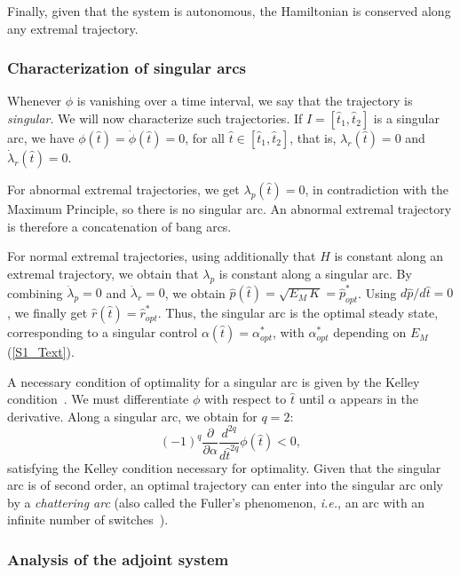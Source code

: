 Finally, given that the system is autonomous, the Hamiltonian is conserved along any extremal trajectory.

\subsubsection{Characterization of singular arcs}

Whenever $\phi$ is vanishing over a time interval, we say that the trajectory is \textit{singular}.
We will now characterize such trajectories.
If $I=[\hat{t}_1,\hat{t}_2]$ is a singular arc, we have $\phi(\hat{t})=\dot{\phi}(\hat{t})=0$, for all $\hat{t}\in[\hat{t}_1,\hat{t}_2]$, that is, $\lambda_r(\hat{t})=0$ and $\dot\lambda_r(\hat{t})=0$. 

For abnormal extremal trajectories, we get $\lambda_p(\hat{t})=0$, in contradiction with the Maximum Principle, so there is no singular arc. An abnormal extremal trajectory is therefore a concatenation of bang arcs.

For normal extremal trajectories, using additionally that $H$ is constant along an extremal trajectory, we obtain that $\lambda_p$ is constant along a singular arc. By combining $\dot \lambda_p=0$ and $\dot \lambda_r=0$, we obtain $\hat{p}(\hat{t})=\sqrt{E_M\, K}=\hat{p}_{opt}^*$. Using $d\hat{p}/d\hat{t}=0$, we finally get $\hat{r}(\hat{t})=\hat{r}_{opt}^*$.
Thus, the singular arc is the optimal steady state, corresponding to a singular control $\alpha(\hat{t})=\alpha_{opt}^*$, with $\alpha_{opt}^*$ depending on $E_M$ (\ref{S1_Text}).

A necessary condition of optimality for a singular arc is given by the Kelley condition~\cite{borisov_fullers_2000}.
We must differentiate $\phi$ with respect to $\hat{t}$ until $\alpha$ appears in the derivative. Along a singular arc, we obtain for $q=2$:
$$
(-1)^q\frac{\partial}{\partial\alpha}\frac{d^{2q}}{d\hat{t}^{2q}}\phi(\hat{t})<0,
$$
satisfying the Kelley condition necessary for optimality. Given that the singular arc is of second order, an optimal trajectory can enter into the singular arc only by a \textit{chattering arc} (also called the Fuller's phenomenon, \textit{i.e.}, an arc with an infinite number of switches~\cite{borisov_fullers_2000,marchal_chattering_2013}). \\


\subsubsection{Analysis of the adjoint system}

